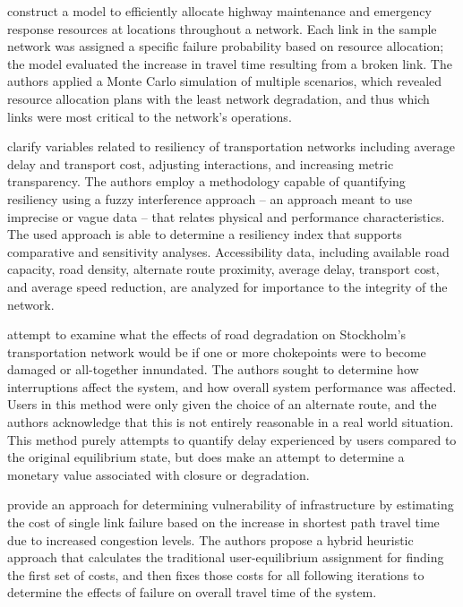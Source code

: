 \citet{peeta2010} construct a model to efficiently allocate
highway maintenance and emergency response resources at locations throughout a network. Each link in the sample network was
assigned a specific failure probability based on resource allocation;
the model evaluated the increase in travel time resulting from a broken
link. The authors applied a Monte Carlo simulation  of multiple scenarios, which revealed resource allocation plans with the least network degradation, and thus which links were most critical to the network's operations.

\citet{serulle2011} clarify variables related to resiliency
of transportation networks including average delay and transport cost,
adjusting interactions,
and increasing metric transparency. The authors employ a methodology
capable of quantifying
resiliency using a fuzzy interference approach – an approach meant to use
imprecise or vague data
– that relates physical and performance characteristics. The used approach
is able to determine a
resiliency index that supports comparative and sensitivity analyses.
Accessibility data, including
available road capacity, road density, alternate route proximity, average
delay, transport cost,
and average speed reduction, are analyzed for importance to the integrity
of the network.

\citet{Berdica2007} attempt to examine what the effects of road
degradation on Stockholm's transportation network would be if one or more
chokepoints were to become damaged or all-together innundated. The authors
sought to determine how interruptions affect the system, and how overall
system performance was affected. Users in this method were only given the
choice of an alternate route, and the authors acknowledge that this is not
entirely reasonable in a real world situation. This method purely attempts
to quantify delay experienced by users compared to the original
equilibrium state, but does make an attempt to determine a monetary value
associated with closure or degradation.

\citet{ibrahim2011} provide an approach for determining
vulnerability of infrastructure by estimating the cost of single link
failure based on the increase in shortest path travel time due to
increased congestion
levels. The authors propose a hybrid heuristic approach that calculates the
traditional user-equilibrium assignment for finding the first set of
costs, and
then fixes those costs for all following iterations to determine the
effects of
failure on overall travel time of the system.

